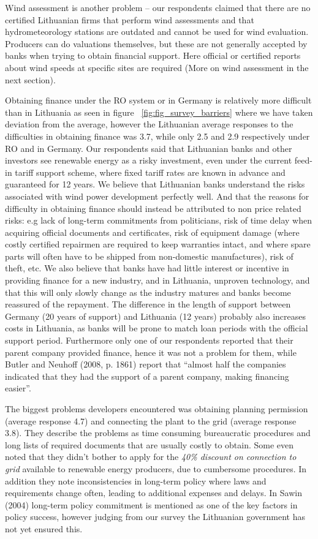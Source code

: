 \documentclass[a4paper, 12pt]{article}
\begin{document}
Wind assessment is another problem – our respondents claimed that there are no certified Lithuanian firms that perform wind assessments and that hydrometeorology stations are outdated and cannot be used for wind evaluation. Producers can do valuations themselves, but these are not generally accepted by banks when trying to obtain financial support. Here official or certified reports about wind speeds at specific sites are required (More on wind assessment in the next section).

Obtaining finance under the RO system or in Germany is relatively more difficult than in Lithuania as seen in figure ~\ref{fig:fig_survey_barriers} where we have taken deviation from the average, however the Lithuanian average responses to the difficulties in obtaining finance was 3.7, while only 2.5 and 2.9 respectively under RO and in Germany. Our respondents said that Lithuanian banks and other investors see renewable energy as a risky investment, even under the current feed-in tariff support scheme, where fixed tariff rates are known in advance and guaranteed for 12 years. We believe that Lithuanian banks understand the risks associated with wind power development perfectly well. And that the reasons for difficulty in obtaining finance should instead be attributed to non price related risks: e.g lack of long-term commitments from politicians, risk of time delay when acquiring official documents and certificates, risk of equipment damage (where costly certified repairmen are required to keep warranties intact, and where spare parts will often have to be shipped from non-domestic manufactures), risk of theft, etc. We also believe that banks have had little interest or incentive in providing finance for a new industry, and in Lithuania, unproven technology, and that this will only slowly change as the industry matures and banks become reassured of the repayment. The difference in the length of support between Germany (20 years of support) and Lithuania (12 years) probably also increases costs in Lithuania, as banks will be prone to match loan periods with the official support period. Furthermore only one of our respondents reported that their parent company provided finance, hence it was not a problem for them, while Butler and Neuhoff (2008, p. 1861) report that ``almost half the companies indicated that they had the support of a parent company, making financing easier''. 

The biggest problems developers encountered was obtaining planning permission (average response 4.7) and connecting the plant to the grid (average response 3.8). They describe the problems as time consuming bureaucratic procedures and long lists of required documents that are usually costly to obtain. Some even noted that they didn’t bother to apply for the \emph{40\% discount on connection to grid} available to renewable energy producers, due to cumbersome procedures. In addition they note inconsistencies in long-term policy where laws and requirements change often, leading to additional expenses and delays. In Sawin (2004) long-term policy commitment is mentioned as one of the key factors in policy success, however judging from our survey the Lithuanian government has not yet ensured this.
\end{document}
